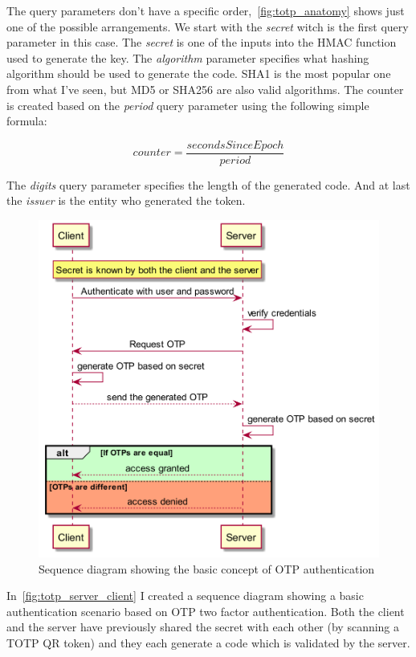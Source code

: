 \documentclass[a4paper,12pt]{report}
\begin{document}
The query parameters don't have a specific order,~\autoref{fig:totp_anatomy}
shows just one of the possible arrangements. We start with the \textit{secret}
witch is the first query parameter in this case. The \textit{secret} is one of
the inputs into the HMAC function used to generate the key. The
\textit{algorithm} parameter specifies what hashing algorithm should be used to
generate the code. SHA1 is the most popular one from what I've seen, but MD5 or
SHA256 are also valid algorithms. The counter is created based on the
\textit{period} query parameter using the following simple formula:

\[counter=\frac{secondsSinceEpoch}{period}\]

The \textit{digits} query parameter specifies the length of the generated code.
And at last the \textit{issuer} is the entity who generated the token.

\begin{figure}[H]
    \centering
    \includegraphics[scale=0.3]{diagrams/sequence/totp.png}
    \caption{Sequence diagram showing the basic concept of OTP authentication}\label{fig:totp_server_client}
\end{figure}

In~\autoref{fig:totp_server_client} I created a sequence diagram showing a
basic authentication scenario based on OTP two factor authentication. Both the
client and the server have previously shared the secret with each other (by
scanning a TOTP QR token) and they each generate a code which is validated by
the server.
\end{document}
